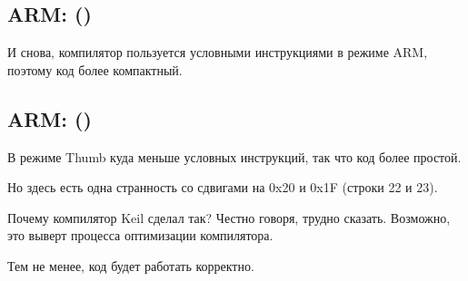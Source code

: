 ﻿\subsection{ARM: \OptimizingKeilVI (\ARMMode)}

И снова, компилятор пользуется условными инструкциями в режиме ARM, поэтому код более 
компактный.



\subsection{ARM: \OptimizingKeilVI (\ThumbMode)}
\myindex{\CompilerAnomaly}
\label{Keil_anomaly}

В режиме Thumb куда меньше условных инструкций, так что код более простой.

Но здесь есть одна странность со сдвигами на 0x20 и 0x1F (строки 22 и 23).

Почему компилятор Keil сделал так?
Честно говоря, трудно сказать.
Возможно, это выверт процесса оптимизации компилятора.

Тем не менее, код будет работать корректно.



